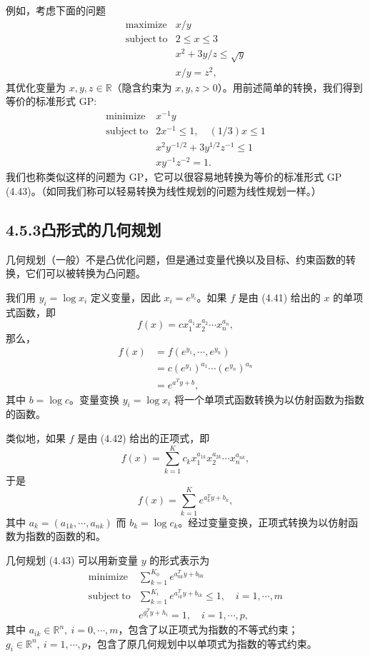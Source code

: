 \documentclass[UTF8,12pt,a4paper,fontset=fandol]{ctexart}
\begin{document}
例如，考虑下面的问题
\[
\begin{array}{ll}
\mathop{\mathrm{maximize}} & x/y\\
\mathrm{subject\ to} & 2\leq x\leq 3\\
& x^2+3y/z\leq \sqrt{y}\\
& x/y=z^2,
\end{array}
\]
其优化变量为 $x,y,z\in\mathbb{R}$（隐含约束为 $x,y,z>0$）。用前述简单的转换，我们得到等价的标准形式 GP:
\[
\begin{array}{ll}
\mathop{\mathrm{minimize}} & x^{-1}y\\
\mathrm{subject\ to} & 2x^{-1}\leq 1,\quad (1/3)x\leq 1\\
& x^2y^{-1/2}+3y^{1/2}z^{-1}\leq 1\\
& xy^{-1}z^{-2}=1.
\end{array}
\]
我们也称类似这样的问题为 GP，它可以很容易地转换为等价的标准形式 GP (4.43)。（如同我们称可以轻易转换为线性规划的问题为线性规划一样。）

\subsection*{4.5.3\quad 凸形式的几何规划}

几何规划（一般）不是凸优化问题，但是通过变量代换以及目标、约束函数的转换，它们可以被转换为凸问题。

我们用 $y_i=\log x_i$ 定义变量，因此 $x_i=e^{y_i}$。如果 $f$ 是由 (4.41) 给出的 $x$ 的单项式函数，即
\[
f(x)=cx_1^{a_1}x_2^{a_2}\cdots x_n^{a_n},
\]
那么，
\[
\begin{aligned}
f(x)&=f(e^{y_1},\cdots,e^{y_n})\\
&=c(e^{y_1})^{a_1}\cdots(e^{y_n})^{a_n}\\
&=e^{a^Ty+b},
\end{aligned}
\]
其中 $b=\log c$。变量变换 $y_i=\log x_i$ 将一个单项式函数转换为以仿射函数为指数的函数。

类似地，如果 $f$ 是由 (4.42) 给出的正项式，即
\[
f(x)=\sum_{k=1}^K c_k x_1^{a_{1k}}x_2^{a_{2k}}\cdots x_n^{a_{nk}},
\]
于是
\[
f(x)=\sum_{k=1}^K e^{a_k^Ty+b_k},
\]
其中 $a_k=(a_{1k},\cdots,a_{nk})$ 而 $b_k=\log c_k$。经过变量变换，正项式转换为以仿射函数为指数的函数的和。

几何规划 (4.43) 可以用新变量 $y$ 的形式表示为
\[
\begin{array}{ll}
\mathop{\mathrm{minimize}} & \displaystyle\sum_{k=1}^{K_0}e^{a_{0k}^Ty+b_{0k}}\\
\mathrm{subject\ to} & \displaystyle\sum_{k=1}^{K_i}e^{a_{ik}^Ty+b_{ik}}\leq 1,\quad i=1,\cdots,m\\
& e^{g_i^Ty+h_i}=1,\quad i=1,\cdots,p,
\end{array}
\]
其中 $a_{ik}\in\mathbb{R}^n,\ i=0,\cdots,m$，包含了以正项式为指数的不等式约束；$g_i\in\mathbb{R}^n,\ i=1,\cdots,p$，包含了原几何规划中以单项式为指数的等式约束。
\end{document}
